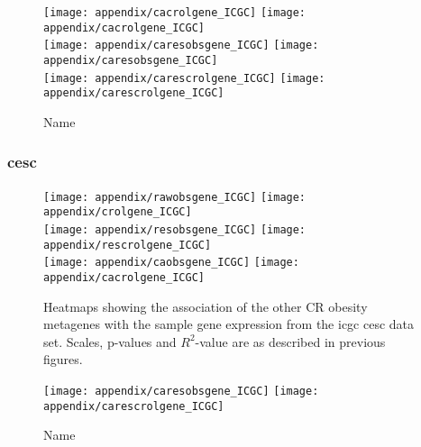 \begin{appendices}
	\begin{figure}[htpb]
		\ContinuedFloat
		\captionsetup{list=off,format=cont}
		\centering
		\texttt{[image: appendix/cacrolgene\_ICGC]}
		\hfill
		\texttt{[image: appendix/cacrolgene\_ICGC]}\\
		\texttt{[image: appendix/caresobsgene\_ICGC]}
		\hfill
		\texttt{[image: appendix/caresobsgene\_ICGC]}\\
		\texttt{[image: appendix/carescrolgene\_ICGC]}
		\hfill
		\texttt{[image: appendix/carescrolgene\_ICGC]}\\
		\caption{Name}
	\end{figure}

	\newpage

	\subsubsection{\gls{cesc}}
	\label{ssub:cesc}
	
	\begin{figure}[htp!]
		\centering
		\texttt{[image: appendix/rawobsgene\_ICGC]}
		\hfill
		\texttt{[image: appendix/crolgene\_ICGC]}\\
		\texttt{[image: appendix/resobsgene\_ICGC]}
		\hfill
		\texttt{[image: appendix/rescrolgene\_ICGC]}\\
		\texttt{[image: appendix/caobsgene\_ICGC]}
		\hfill
		\texttt{[image: appendix/cacrolgene\_ICGC]}\\
		\caption{Heatmaps showing the association of the other CR obesity metagenes with the sample gene expression from the \gls{icgc} \gls{cesc} data set.
		Scales, p-values and $R^2$-value are as described in previous figures.}
		\label{fig:degmetaicgc_cesc}
	\end{figure}

	\begin{figure}[htpb]
		\ContinuedFloat
		\captionsetup{list=off,format=cont}
		\centering
		\texttt{[image: appendix/caresobsgene\_ICGC]}
		\hfill
		\texttt{[image: appendix/carescrolgene\_ICGC]}\\
		\caption{Name}
	\end{figure}


\end{appendices}

